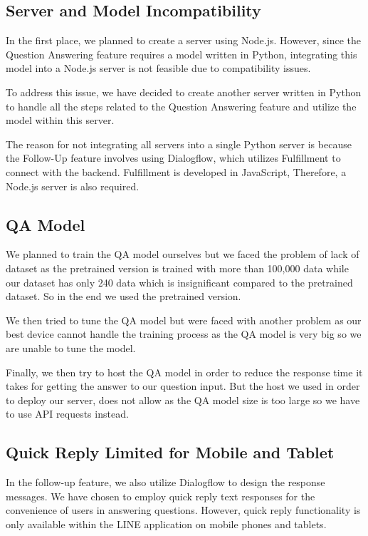 \documentclass[12pt,oneside,openright,a4paper]{cpe-english-project}
\begin{document}
        \subsection{Server and Model Incompatibility}
          \qquad In the first place, we planned to create a server using Node.js. However, since the Question Answering feature requires a model written in Python, integrating this model into a Node.js server is not feasible due to compatibility issues. \par
          \qquad To address this issue, we have decided to create another server written in Python to handle all the steps related to the Question Answering feature and utilize the model within this server.\par
          \qquad The reason for not integrating all servers into a single Python server is because the Follow-Up feature involves using Dialogflow, which utilizes Fulfillment to connect with the backend. Fulfillment is developed in JavaScript, Therefore, a Node.js server is also required. \par
        \subsection{QA Model}
          \qquad We planned to train the QA model ourselves but we faced the problem of lack of dataset as the pretrained version is trained with more than 100,000 data while our dataset has only 240 data which is insignificant compared to the pretrained dataset. So in the end we used the pretrained version. \par
          \qquad We then tried to tune the QA model but were faced with another problem as our best device cannot handle the training process as the QA model is very big so we are unable to tune the model. \par
          \qquad Finally, we then try to host the QA model in order to reduce the response time it takes for getting the answer to our question input. But the host we used in order to deploy our server, does not allow as the QA model size is too large so we have to use API requests instead. \par
        \subsection{Quick Reply Limited for Mobile and Tablet}
          \qquad In the follow-up feature, we also utilize Dialogflow to design the response messages. We have chosen to employ quick reply text responses for the convenience of users in answering questions. However, quick reply functionality is only available within the LINE application on mobile phones and tablets. \par
\end{document}
